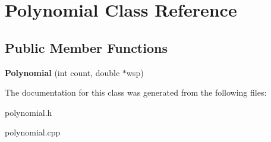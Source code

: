 \hypertarget{classPolynomial}{}\section{Polynomial Class Reference}
\label{classPolynomial}
\subsection*{Public Member Functions}
\begin{DoxyCompactItemize}
\item 
\mbox{\label{classPolynomial_a72a45fd57c6326eeb15fc478ae938bf1}} 
{\bfseries Polynomial} (int count, double $\ast$wsp)
\end{DoxyCompactItemize}


The documentation for this class was generated from the following files\+:\begin{DoxyCompactItemize}
\item 
polynomial.\+h\item 
polynomial.\+cpp\end{DoxyCompactItemize}
